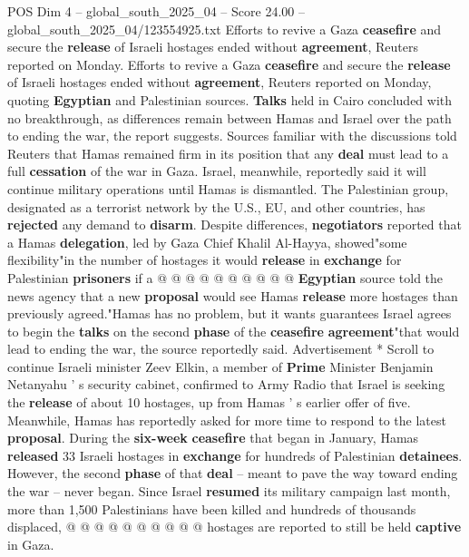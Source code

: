\begin{textsample}{POS Dim 4 – global\_south\_2025\_04 – Score 24.00 – global\_south\_2025\_04/123554925.txt}  \label{ex:f4_pos_222}
Efforts to revive a Gaza \textbf{ceasefire} and secure the \textbf{release} of Israeli hostages ended without \textbf{agreement}, Reuters reported on Monday.
Efforts to revive a Gaza \textbf{ceasefire} and secure the \textbf{release} of Israeli hostages ended without \textbf{agreement}, Reuters reported on Monday, quoting \textbf{Egyptian} and Palestinian sources. \textbf{Talks} held in Cairo concluded with no breakthrough, as differences remain between Hamas and Israel over the path to ending the war, the report suggests.
Sources familiar with the discussions told Reuters that Hamas remained firm in its position that any \textbf{deal} must lead to a full \textbf{cessation} of the war in Gaza.
Israel, meanwhile, reportedly said it will continue military operations until Hamas is dismantled.
The Palestinian group, designated as a terrorist network by the U.S., EU, and other countries, has \textbf{rejected} any demand to \textbf{disarm}.
Despite differences, \textbf{negotiators} reported that a Hamas \textbf{delegation}, led by Gaza Chief Khalil Al-Hayya, showed"some flexibility"in the number of hostages it would \textbf{release} in \textbf{exchange} for Palestinian \textbf{prisoners} if a @ @ @ @ @ @ @ @ @ @ \textbf{Egyptian} source told the news agency that a new \textbf{proposal} would see Hamas \textbf{release} more hostages than previously agreed."Hamas has no problem, but it wants guarantees Israel agrees to begin the \textbf{talks} on the second \textbf{phase} of the \textbf{ceasefire} \textbf{agreement}"that would lead to ending the war, the source reportedly said.
Advertisement * Scroll to continue Israeli minister Zeev Elkin, a member of \textbf{Prime} Minister Benjamin Netanyahu ' s security cabinet, confirmed to Army Radio that Israel is seeking the \textbf{release} of about 10 hostages, up from Hamas ' s earlier offer of five.
Meanwhile, Hamas has reportedly asked for more time to respond to the latest \textbf{proposal}.
During the \textbf{six-week} \textbf{ceasefire} that began in January, Hamas \textbf{released} 33 Israeli hostages in \textbf{exchange} for hundreds of Palestinian \textbf{detainees}.
However, the second \textbf{phase} of that \textbf{deal} -- meant to pave the way toward ending the war -- never began.
Since Israel \textbf{resumed} its military campaign last month, more than 1,500 Palestinians have been killed and hundreds of thousands displaced, @ @ @ @ @ @ @ @ @ @ hostages are reported to still be held \textbf{captive} in Gaza.

\end{textsample}
